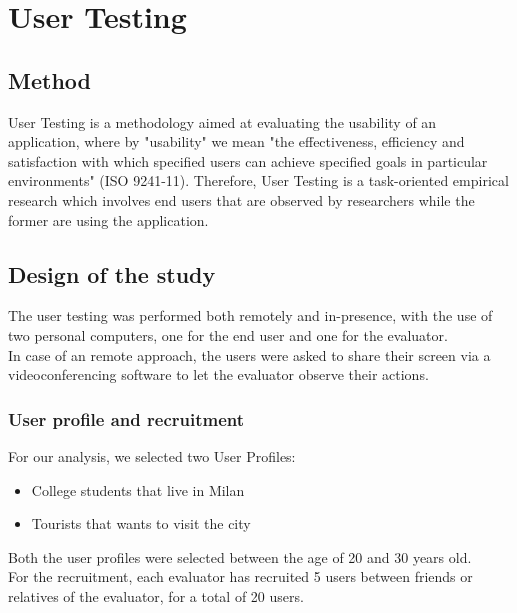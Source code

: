 
\section{User Testing}
\subsection{Method}

User Testing is a methodology aimed at evaluating the usability of an application, where by "usability" we mean "the effectiveness, efficiency and satisfaction with which specified users can achieve specified goals in particular environments" (ISO 9241-11). Therefore, User Testing is a task-oriented empirical research which involves end users that are observed by researchers while the former are using the application.

\subsection{Design of the study}
    The user testing was performed both remotely and in-presence, with the use of two personal computers, one for the end user and one for the evaluator.\\
    In case of an remote approach, the users were asked to share their screen via a videoconferencing software to let the evaluator observe their actions.

    \subsubsection{User profile and recruitment}
    For our analysis, we selected two User Profiles:

    \begin{itemize}
        \item College students that live in Milan 
        \item Tourists that wants to visit the city
    \end{itemize}

    Both the user profiles were selected between the age of 20 and 30 years old.\\
    For the recruitment, each evaluator has recruited 5 users between friends or relatives of the evaluator, for a total of 20 users.

